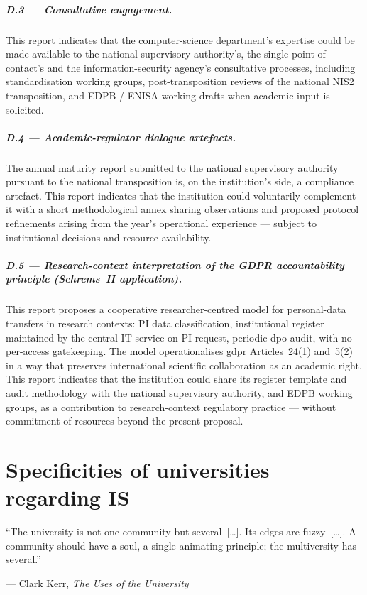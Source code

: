 \subparagraph{D.3 --- Consultative engagement.}
This report indicates that the computer-science department's
expertise could be made available to the national supervisory
authority's, the single point of contact's and the
information-security agency's consultative processes, including
standardisation working groups, post-transposition reviews of
the national NIS2 transposition, and EDPB / ENISA working drafts
when academic input is solicited.

\subparagraph{D.4 --- Academic-regulator dialogue artefacts.}
The annual maturity report submitted to the
national supervisory authority pursuant to the national
transposition is, on the institution's side, a compliance
artefact. This report indicates that the institution could
voluntarily complement it with a short methodological annex
sharing observations and proposed protocol refinements arising
from the year's operational experience --- subject to
institutional decisions and resource availability.

\subparagraph{D.5 --- Research-context interpretation of the GDPR accountability principle (\emph{Schrems~II} application).}
This report proposes a cooperative researcher-centred model for
personal-data transfers in research contexts: PI data
classification, institutional register maintained by the central
IT service on PI request, periodic \gls{dpo} audit, with no
per-access gatekeeping. The model operationalises \gls{gdpr}
Articles~24(1) and~5(2) in a way that preserves international
scientific collaboration as an academic right. This report
indicates that the institution could share its register template
and audit methodology with the national supervisory authority,
 and
EDPB working groups, as a contribution to research-context
regulatory practice --- without commitment of resources beyond
the present proposal.

\section{Specificities of universities regarding IS}
\label{sec:specificites}

\epigraph{``The university is not one community but several~[\ldots]. Its edges are fuzzy~[\ldots]. A community should have a soul, a single animating principle; the multiversity has several.''}{--- Clark Kerr, \textit{The Uses of the University}~\cite{kerr1963}}


